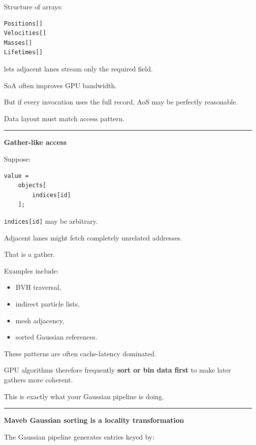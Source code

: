 Structure of arrays:

\protect{}\label{atbpdt}%
\begin{verbatim}
Positions[]
Velocities[]
Masses[]
Lifetimes[]
\end{verbatim}

lets adjacent lanes stream only the required field.

SoA often improves GPU bandwidth.

But if every invocation uses the full record, AoS may be perfectly reasonable.

Data layout must match access pattern.

\begin{center}\rule{0.5\linewidth}{0.5pt}\end{center}

\textbf{Gather-like access}

Suppose:

\protect{}\label{yx7r08}%
\begin{verbatim}
value =
    objects[
        indices[id]
    ];
\end{verbatim}

\texttt{indices{[}id{]}} may be arbitrary.

Adjacent lanes might fetch completely unrelated addresses.

That is a gather.

Examples include:

\begin{itemize}
\tightlist
\item
  BVH traversal,
\item
  indirect particle lists,
\item
  mesh adjacency,
\item
  sorted Gaussian references.
\end{itemize}

These patterns are often cache-latency dominated.

GPU algorithms therefore frequently \textbf{sort or bin data first} to make later gathers more coherent.

This is exactly what your Gaussian pipeline is doing.

\begin{center}\rule{0.5\linewidth}{0.5pt}\end{center}

\textbf{Maveb Gaussian sorting is a locality transformation}

The Gaussian pipeline generates entries keyed by:

